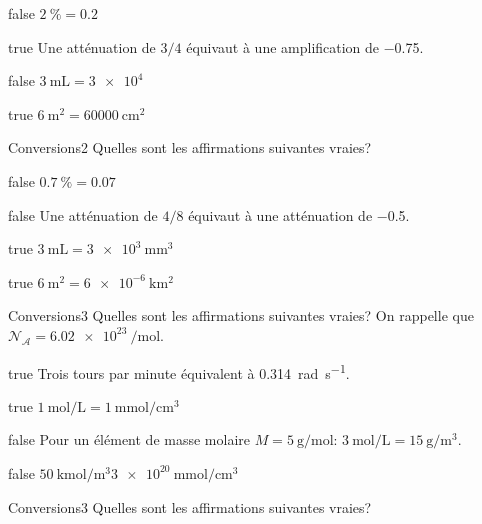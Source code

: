         \begin{reponses}
            \item[false] $\SI{2}{\percent} = \num{0.2}$
            \item[true] Une atténuation de $3/4$ équivaut à une amplification de \num{-.75}.
            \item[false] $\SI{3}{\milli\liter} = \num{3e4}$
            \item[true] $\SI{6}{\meter\squared} = \SI{60000}{\centi\meter\squared}$
        \end{reponses}
        \begin{question}{}{Conversions}{2}{}
            Quelles sont les affirmations suivantes vraies?
        \end{question}
        \begin{reponses}
            \item[false] $\SI{0.7}{\percent} = \num{0.07}$
            \item[false] Une atténuation de $4/8$ équivaut à une atténuation de \num{-0.5}.
            \item[true] $\SI{3}{\milli\liter} = \SI{3e3}{\milli\meter\cubed}$
            \item[true] $\SI{6}{\meter\squared} = \SI{6e-6}{\kilo\meter\squared}$
        \end{reponses}
        \begin{question}{}{Conversions}{3}{}
            Quelles sont les affirmations suivantes vraies? On rappelle que $\mathcal{N_A} = \SI{6.02e23}{\per\mole}$.
        \end{question}
        \begin{reponses}
            \item[true] Trois tours par minute équivalent à \SI{0.314}{\radian\per\second}.
            \item[true] $\SI{1}{\mole\per\liter} = \SI{1}{\milli\mole\per\centi\meter\cubed}$
            \item[false] Pour un élément de masse molaire $M = \SI{5}{\gram\per\mole}$: $\SI{3}{\mole\per\liter} = \SI{15}{\gram\per\meter\cubed}$.
            \item[false] $\SI{50}{\kilo\mole\per\meter\cubed} \SI{3e20}{\milli\mole\per\centi\meter\cubed}$
        \end{reponses}
		\begin{question}{}{Conversions}{3}{}
            Quelles sont les affirmations suivantes vraies?
        \end{question}
